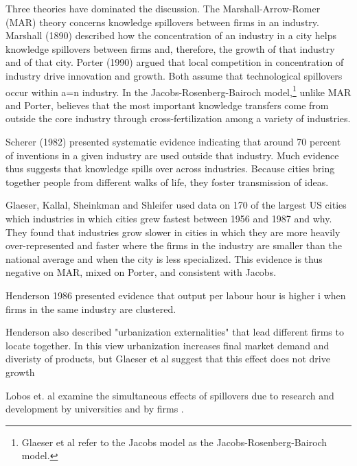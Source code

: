 Three theories have dominated the discussion. The Marshall-Arrow-Romer (MAR) theory concerns knowledge spillovers between firms in an industry.  Marshall (1890) described how the concentration of an industry in a city helps knowledge
spillovers between firms and, therefore, the growth of that industry and of that city. Porter (1990) argued that local competition in concentration of industry drive innovation and growth. Both assume that technological spillovers occur within a=n industry. In the Jacobs-Rosenberg\cite{rosenbergTechnologicalChangeMachine1963}-Bairoch \cite{bairochCitiesEconomicDevelopment1988} model,\footnote{Glaeser et al \cite{glaeserGrowthCities1991} refer to the Jacobs model as the Jacobs-Rosenberg\cite{rosenbergTechnologicalChangeMachine1963}-Bairoch \cite{bairochCitiesEconomicDevelopment1988} model. } unlike MAR and Porter, believes that the most important knowledge transfers come from outside the core industry through cross-fertilization among a variety  of  industries.


Scherer (1982) presented systematic evidence indicating that around 70 percent of inventions in a given industry are used outside that industry. Much evidence thus suggests that knowledge spills over across industries. Because cities bring together people from different walks of life, they foster transmission of ideas.


Glaeser, Kallal, Sheinkman and Shleifer \cite{glaeserGrowthCities1991} used data on 170 of the largest US cities which industries in which cities grew fastest between 1956 and 1987 and why. They found that  industries grow slower in cities in which
they are more heavily over-represented and faster where the firms in the industry are smaller than the national average  and when the city is less specialized. This evidence is
thus negative on MAR, mixed on Porter, and consistent with Jacobs.

Henderson 1986 presented evidence that output per labour hour is higher i when firms in the same industry are clustered.

Henderson also described "urbanization externalities" that lead different firms to locate together. In this view urbanization increases final market demand and diveristy of products, but Glaeser et al suggest that this effect does not drive growth

Lobos et. al examine the simultaneous effects of spillovers due to research and development by universities and by firms \cite{belderbosWhatSpilloversUniversities2022}.

